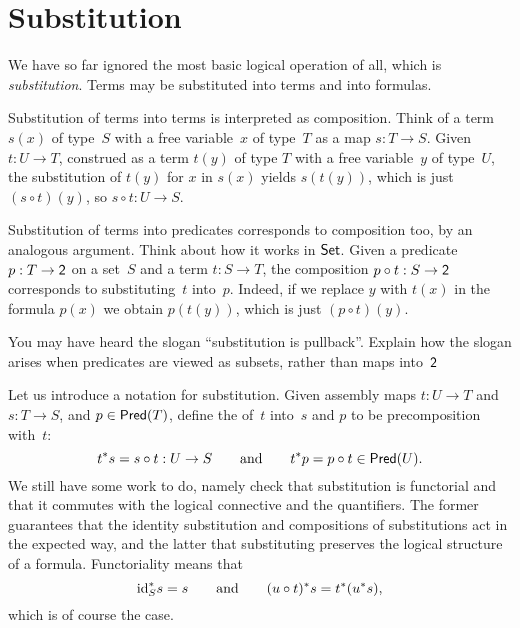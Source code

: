 \section{Substitution}
\label{sec:beck-chevalley}

We have so far ignored the most basic logical operation of all, which
is \emph{substitution}. Terms may be substituted into terms and into formulas.


Substitution of terms into terms is interpreted as composition.
Think of a term $s(x)$ of type~$S$ with a free variable~$x$ of type~$T$ as a map $s : T \to S$. Given $t : U \to T$, construed as a term $t(y)$ of type $T$ with a free variable~$y$ of type~$U$, the substitution of $t(y)$ for $x$ in $s(x)$ yields $s(t(y))$, which is just $(s \circ t)(y)$, so $s \circ t : U \to S$.

Substitution of terms into predicates corresponds to composition too, by an analogous argument. Think about how it works in $\Set$. Given a predicate $p : T \to \two$ on a set~$S$ and a term $t : S \to T$, the composition $p \circ t : S \to \two$ corresponds to substituting~$t$ into~$p$. Indeed, if we replace $y$ with $t(x)$ in the formula $p(x)$ we obtain $p (t(y))$, which is just $(p \circ t)(y)$.

\begin{exercise}
  You may have heard the slogan ``substitution is pullback''.
  Explain how the slogan arises when predicates are viewed as subsets, rather than maps into~$\two$
\end{exercise}

Let us introduce a notation for substitution. Given assembly maps $t : U \to T$ and $s : T \to S$, and $p \in \Pred{T}$, define the  of~$t$ into~$s$ and $p$ to be precomposition with~$t$:
%
\begin{equation*}
 \invim{t} s = s \circ t : U \to S
 \qquad\text{and}\qquad
 \invim{t} p = p \circ t \in \Pred{U}.
\end{equation*}
%
We still have some work to do, namely check that substitution is functorial and that it commutes with the logical connective and the quantifiers. The former guarantees that the identity substitution and compositions of substitutions act in the expected way, and the latter that substituting preserves the logical structure of a formula. Functoriality means that
%
\begin{equation*}
  \invim{\id[S]} s = s
  \qquad\text{and}\qquad
  \invim{(u \circ t)} s = \invim{t} (\invim{u} s),
\end{equation*}
%
which is of course the case.

